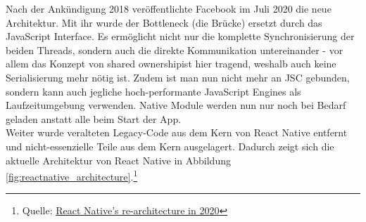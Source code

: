 Nach der Ankündigung 2018 veröffentlichte Facebook im Juli 2020 die neue Architektur. Mit ihr wurde der Bottleneck (die Brücke) ersetzt durch das JavaScript Interface. 
Es ermöglicht nicht nur die komplette Synchronisierung der beiden Threads, sondern auch die direkte Kommunikation untereinander - vor allem das Konzept von \glqq shared ownership\grqq ist hier tragend, weshalb auch keine Serialisierung mehr nötig ist.
Zudem  ist man nun nicht mehr an JSC gebunden, sondern kann auch jegliche hoch-performante JavaScript Engines als Laufzeitumgebung verwenden.
Native Module werden nun nur noch bei Bedarf geladen anstatt alle beim Start der App.\\
Weiter wurde veralteten Legacy-Code aus dem Kern von React Native entfernt und nicht-essenzielle Teile aus dem Kern ausgelagert. Dadurch zeigt sich die aktuelle Architektur von React Native in Abbildung \ref{fig:reactnative_architecture}.\footnote{Quelle: \href{https://medium.com/swlh/react-natives-re-architecture-in-2020-9bb82659792c}{React Native's re-architecture in 2020}}

